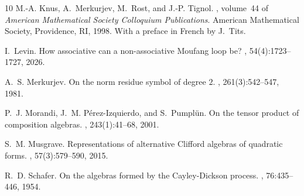 \documentclass{jonasart}
\begin{document}
{\begin{thebibliography}{10}
            M.-A. Knus, A.~Merkurjev, M.~Rost, and J.-P. Tignol.
            , volume~44 of {\em American Mathematical Society Colloquium Publications}.
            \newblock American Mathematical Society, Providence, RI, 1998.
            \newblock With a preface in French by J.\ Tits.
            
            I.~Levin.
            \newblock How associative can a non-associative {M}oufang loop be?
            , 54(4):1723--1727, 2026.
            
            A.~S. Merkurjev.
            \newblock On the norm residue symbol of degree {$2$}.
            , 261(3):542--547, 1981.
            
            P.~J. Morandi, J.~M. P\'erez-Izquierdo, and S.~Pumpl\"un.
            \newblock On the tensor product of composition algebras.
            , 243(1):41--68, 2001.
            
            S.~M. Musgrave.
            \newblock Representations of alternative {C}lifford algebras of quadratic forms.
            , 57(3):579--590, 2015.
            
            R.~D. Schafer.
            \newblock On the algebras formed by the {C}ayley-{D}ickson process.
            , 76:435--446, 1954.
        \end{thebibliography}
	}
\end{document}
